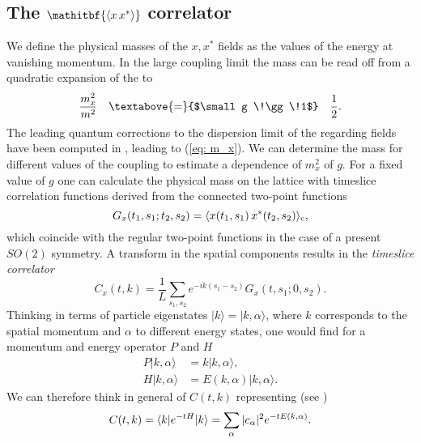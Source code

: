 \subsection[The $\langle xx^{*}\rangle$ correlator]{The {$\mathitbf{\langle x\,x^{*}\rangle}$} correlator}
We define the physical masses of the $x,x^{*}$ fields as the values of the energy at vanishing momentum. In the large coupling limit the mass can be read off from a quadratic expansion of the  \cite{Bianchi:2016cyv} to 
%
%
\begin{equation}
\frac{m_{x}^{2}}{m^{2}} \quad \textabove{=}{$\small g \!\gg \!1$} \quad \frac{1}{2}.
\end{equation}
%
%
The leading quantum corrections to the dispersion limit of the regarding fields have been computed in \cite{Giombi:2010bj}, leading to (\ref{eq: m_x}). We can determine the mass for different values of the coupling to estimate a dependence of $m_{x}^{2}$ of $g$. For a fixed value of $g$ one can calculate the physical mass on the lattice with timeslice correlation functions derived from the connected two-point functions
%
%
\begin{equation}
G_{x}(t_{1},s_{1};t_{2},s_{2}) = \langle x(t_{1},s_{1})\, x^{*}(t_{2},s_{2}) \rangle_{\rm c},
\end{equation}
%
%
which coincide with the regular two-point functions in the case of a present $SO(2)$ symmetry. A  transform in the spatial components results in the \textit{timeslice correlator}
%
%
\begin{equation}
C_{x}(t,k) = \frac{1}{L}\sum\limits_{s_{1},s_{2}} e^{-ik(s_{1}-s_{2})} G_{x}(t,s_{1};0,s_{2}).
\end{equation}
%
%
Thinking in terms of particle eigenstates $\vert k \rangle = \vert k,\alpha \rangle$, where $k$ corresponds to the spatial momentum and $\alpha$ to different energy states, one would find for a momentum and energy operator $P$ and $H$
%
%
\begin{align}
P \vert k,\alpha \rangle &= k \vert k,\alpha \rangle, \\
H \vert k,\alpha \rangle &= E(k,\alpha) \vert k,\alpha \rangle.
\end{align}
%
%
We can therefore think in general of $C(t,k)$ representing (see \cite{montvay_lattice})
%
%
\begin{equation}
C(t,k) = \langle k\vert e^{-tH} \vert k \rangle = \sum\limits_{\alpha} \vert c_{\alpha} \vert^{2} e^{-t E(k,\alpha)}.
\raisetag{-8pt}
\end{equation}
